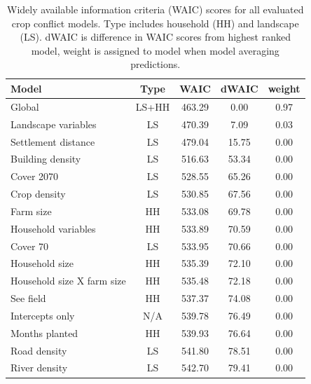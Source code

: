 \documentclass[12pt,]{article}
\begin{document}
\begin{table}[]
\centering
\footnotesize
\caption{Widely available information criteria (WAIC) scores for all evaluated crop conflict models. Type includes household (HH) and landscape (LS). dWAIC is difference in WAIC scores from highest ranked model, weight is assigned to model when model averaging predictions.}
\begin{tabular}{lcccc}
\hline
\textbf{Model}             & \textbf{Type} & \textbf{WAIC} & \textbf{dWAIC} & \textbf{weight} \\ \hline
Global                     & LS+HH         & 463.29        & 0.00           & 0.97            \\
Landscape variables        & LS            & 470.39        & 7.09           & 0.03            \\
Settlement distance        & LS            & 479.04        & 15.75          & 0.00            \\
Building density           & LS            & 516.63        & 53.34          & 0.00            \\
Cover 2070                 & LS            & 528.55        & 65.26          & 0.00            \\
Crop density               & LS            & 530.85        & 67.56          & 0.00            \\
Farm size                  & HH            & 533.08        & 69.78          & 0.00            \\
Household variables        & HH            & 533.89        & 70.59          & 0.00            \\
Cover 70                   & LS            & 533.95        & 70.66          & 0.00            \\
Household size             & HH            & 535.39        & 72.10          & 0.00            \\
Household size X farm size & HH            & 535.48        & 72.18          & 0.00            \\
See field                  & HH            & 537.37        & 74.08          & 0.00            \\
Intercepts only            & N/A           & 539.78        & 76.49          & 0.00            \\
Months planted             & HH            & 539.93        & 76.64          & 0.00            \\
Road density               & LS            & 541.80        & 78.51          & 0.00            \\
River density              & LS            & 542.70        & 79.41          & 0.00        
\\
\hline
\end{tabular}

\label{tab:WAICcroptable}
\end{table}
\end{document}
